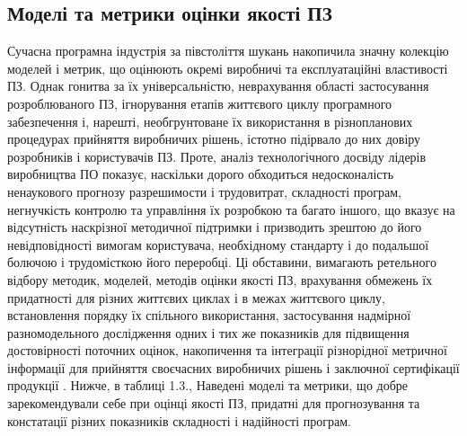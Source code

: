\subsection{Моделі та метрики оцінки якості ПЗ}
\label{2section:id6}
Сучасна програмна індустрія за півстоліття шукань накопичила значну колекцію моделей і метрик, що оцінюють окремі виробничі та експлуатаційні властивості ПЗ. Однак гонитва за їх універсальністю, неврахування області застосування розроблюваного ПЗ, ігнорування етапів життєвого циклу програмного забезпечення і, нарешті, необгрунтоване їх використання в різнопланових процедурах прийняття виробничих рішень, істотно підірвало до них довіру розробників і користувачів ПЗ.
Проте, аналіз технологічного досвіду лідерів виробництва ПО показує, наскільки дорого обходиться недосконалість ненаукового прогнозу разрешимости і трудовитрат, складності програм, негнучкість контролю та управління їх розробкою та багато іншого, що вказує на відсутність наскрізної методичної підтримки і призводить зрештою до його невідповідності вимогам користувача, необхідному стандарту і до подальшої болючою і трудомісткою його переробці. Ці обставини, вимагають ретельного відбору методик, моделей, методів оцінки якості ПЗ, врахування обмежень їх придатності для різних життєвих циклах і в межах життєвого циклу, встановлення порядку їх спільного використання, застосування надмірної разномодельного дослідження одних і тих же показників для підвищення достовірності поточних оцінок, накопичення та інтеграції різнорідної метричної інформації для прийняття своєчасних виробничих рішень і заключної сертифікації продукції . Нижче, в таблиці 1.3., Наведені моделі та метрики, що добре зарекомендували себе при оцінці якості ПЗ, придатні для прогнозування та констатації різних показників складності і надійності програм.


